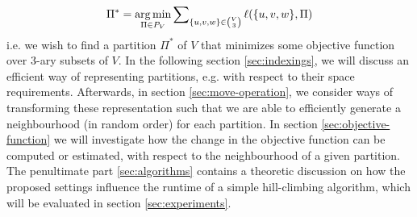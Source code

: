 \begin{align*}
    \Pi^* = \operatorname*{\arg\min}_{\Pi \in P_V} \sum\nolimits_{\{u,v,w\} \in \binom{V}{3}} \ell(\{u,v,w\},\Pi)
\end{align*}
i.e. we wish to find a partition $\Pi^*$ of $V$ that minimizes some objective function over $3$-ary subsets of $V$. In the following section \ref{sec:indexings}, we will discuss an efficient way of representing partitions, e.g. with respect to their space requirements. Afterwards, in section \ref{sec:move-operation}, we consider ways of transforming these representation such that we are able to efficiently generate a neighbourhood (in random order) for each partition. In section \ref{sec:objective-function} we will investigate how the change in the objective function can be computed or estimated, with respect to the neighbourhood of a given partition. The penultimate part \ref{sec:algorithms} contains a theoretic discussion on how the proposed settings influence the runtime of a simple hill-climbing algorithm, which will be evaluated in section \ref{sec:experiments}.